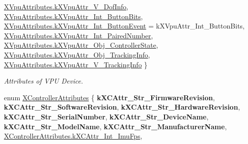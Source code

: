 \begin{DoxyCompactItemize}
\mbox{\hyperlink{class_ximmerse_1_1_input_system_1_1_x_device_plugin_a93f84daf5ee0da44d8346e78df766f6ba332494a2914f93233d8c3e8dc6b858e6}{X\+Vpu\+Attributes.\+k\+X\+Vpu\+Attr\+\_\+\+V\+\_\+Dof\+Info}}, 
\newline
\mbox{\hyperlink{class_ximmerse_1_1_input_system_1_1_x_device_plugin_a93f84daf5ee0da44d8346e78df766f6ba937e342e24ac994ed1ffb99f37fee2d0}{X\+Vpu\+Attributes.\+k\+X\+Vpu\+Attr\+\_\+\+Int\+\_\+\+Button\+Bits}}, 
\mbox{\hyperlink{class_ximmerse_1_1_input_system_1_1_x_device_plugin_a93f84daf5ee0da44d8346e78df766f6ba70b64bac812a291402e10067b2dbfd19}{X\+Vpu\+Attributes.\+k\+X\+Vpu\+Attr\+\_\+\+Int\+\_\+\+Button\+Event}} = k\+X\+Vpu\+Attr\+\_\+\+Int\+\_\+\+Button\+Bits, 
\mbox{\hyperlink{class_ximmerse_1_1_input_system_1_1_x_device_plugin_a93f84daf5ee0da44d8346e78df766f6ba3ee49f8c7188ed8152a6c807a1cde6b7}{X\+Vpu\+Attributes.\+k\+X\+Vpu\+Attr\+\_\+\+Int\+\_\+\+Paired\+Number}}, 
\mbox{\hyperlink{class_ximmerse_1_1_input_system_1_1_x_device_plugin_a93f84daf5ee0da44d8346e78df766f6ba71f91f7813019129b6a7f32df55ee967}{X\+Vpu\+Attributes.\+k\+X\+Vpu\+Attr\+\_\+\+Obj\+\_\+\+Controller\+State}}, 
\newline
\mbox{\hyperlink{class_ximmerse_1_1_input_system_1_1_x_device_plugin_a93f84daf5ee0da44d8346e78df766f6baec86360d15f6bdb485a1f5eb849cb629}{X\+Vpu\+Attributes.\+k\+X\+Vpu\+Attr\+\_\+\+Obj\+\_\+\+Tracking\+Info}}, 
\mbox{\hyperlink{class_ximmerse_1_1_input_system_1_1_x_device_plugin_a93f84daf5ee0da44d8346e78df766f6baaa82108f6eee2518844b9ec2b82c3278}{X\+Vpu\+Attributes.\+k\+X\+Vpu\+Attr\+\_\+\+V\+\_\+\+Tracking\+Info}}
 \}
\begin{DoxyCompactList}\small\item\em Attributes of V\+PU Device. \end{DoxyCompactList}\item 
enum \mbox{\hyperlink{class_ximmerse_1_1_input_system_1_1_x_device_plugin_afcbca328b7e8b25147ddd45c6989d908}{X\+Controller\+Attributes}} \{ \newline
{\bfseries k\+X\+C\+Attr\+\_\+\+Str\+\_\+\+Firmware\+Revision}, 
{\bfseries k\+X\+C\+Attr\+\_\+\+Str\+\_\+\+Software\+Revision}, 
{\bfseries k\+X\+C\+Attr\+\_\+\+Str\+\_\+\+Hardware\+Revision}, 
{\bfseries k\+X\+C\+Attr\+\_\+\+Str\+\_\+\+Serial\+Number}, 
\newline
{\bfseries k\+X\+C\+Attr\+\_\+\+Str\+\_\+\+Device\+Name}, 
{\bfseries k\+X\+C\+Attr\+\_\+\+Str\+\_\+\+Model\+Name}, 
{\bfseries k\+X\+C\+Attr\+\_\+\+Str\+\_\+\+Manufacturer\+Name}, 
\mbox{\hyperlink{class_ximmerse_1_1_input_system_1_1_x_device_plugin_afcbca328b7e8b25147ddd45c6989d908a4e0c5c049d5a4c811e693b8719b82375}{X\+Controller\+Attributes.\+k\+X\+C\+Attr\+\_\+\+Int\+\_\+\+Imu\+Fps}}, 

\end{DoxyCompactItemize}
